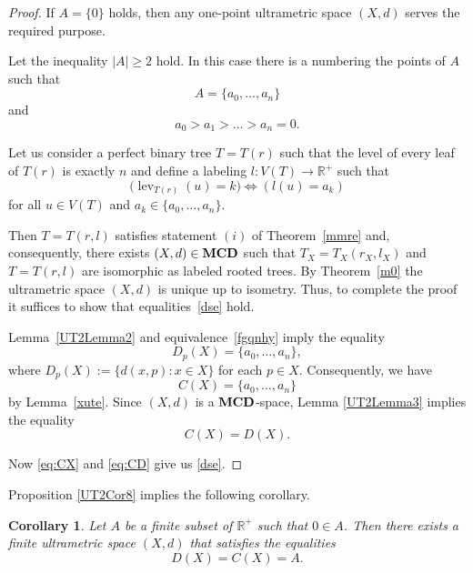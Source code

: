 \documentclass{raex}
\newtheorem{cor}[thm]{Corollary}
\theoremstyle{definition}
\theoremstyle{remark}
\numberwithin{equation}{section}
\begin{document}
\begin{proof}
    If $A = \{0\}$ holds, then any one-point ultrametric space $(X,d)$ serves the required purpose.


Let the inequality $|A| \ge 2$ hold.
In this case there is a numbering the points of $A$ such that
\begin{equation*}
A=\{a_0,\ldots,a_n\}
\end{equation*}
and
\begin{equation*}
a_0>a_1>\ldots>a_n=0.
\end{equation*}


    Let us consider a perfect binary tree  $T=T(r)$ such that
the level of every leaf of $T(r)$ is exactly $n$
    and define a labeling $l: V(T)\to \mathbb{R}^+$ such that 
\begin{equation}\label{fgqnhy}
\bigl(\operatorname{lev}_{T(r)}(u)=k\bigr)
\iff
\left(
l(u)=a_k
\right)
\end{equation}
for all $u\in V(T)$
and $a_k\in\{a_0,\ldots,a_n\}.$

Then $T=T(r,l)$ satisfies statement $(i)$ of Theorem~\ref{mmre} and, consequently, there exists 
\(
(X,d)\in {\bf MCD}
\)
such that
\(
T_X=T_X(r_X,l_X)
\)
and
\(
T=T(r,l)
\)
are isomorphic as labeled rooted trees. By Theorem~\ref{m0} the ultrametric space $(X,d)$ is unique up to isometry.
Thus, to complete the proof it suffices to show that equalities~\eqref{dse} hold.

Lemma~\ref{UT2Lemma2} and equivalence~\eqref{fgqnhy}  imply the equality
\begin{equation*}
D_p(X)=\{a_0,\ldots,a_n\},
\end{equation*}
where $D_p(X):=\{d(x,p):x\in X\}$
for each
$p\in X$.
Consequently, we have
\begin{equation}\label{eq:CX}
C(X)=\{a_0,\ldots,a_n\}
\end{equation}
by Lemma~\ref{xute}. Since $(X,d)$ is a ${\bf MCD}$-space, Lemma \ref{UT2Lemma3} implies the equality
\begin{equation}\label{eq:CD}
C(X)=D(X).
\end{equation}

Now \eqref{eq:CX} and \eqref{eq:CD} give us \eqref{dse}.
\end{proof}


Proposition \ref{UT2Cor8} implies the following corollary.


\begin{cor}\label{ee}
Let $A$ be
a finite subset of $\mathbb{R}^{+}$ such
that $0\in A$. Then there exists
a finite ultrametric space $(X,d)$
that satisfies the
equalities
\[
D(X)=C(X)=A.
\]
\end{cor}
\end{document}

